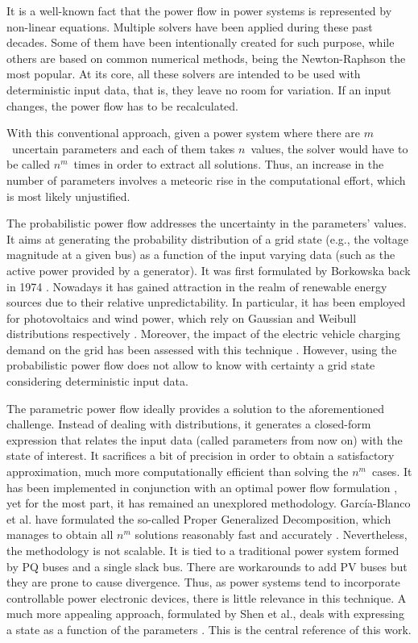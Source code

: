 It is a well-known fact that the power flow in power systems is represented by non-linear equations. Multiple solvers have been applied during these past decades. Some of them have been intentionally created for such purpose, while others are based on common numerical methods, being the Newton-Raphson the most popular. At its core, all these solvers are intended to be used with deterministic input data, that is, they leave no room for variation. If an input changes, the power flow has to be recalculated.

With this conventional approach, given a power system where there are $m$~uncertain parameters and each of them takes $n$~values, the solver would have to be called $n^m$~times in order to extract all solutions. Thus, an increase in the number of parameters involves a meteoric rise in the computational effort, which is most likely unjustified. 

The probabilistic power flow addresses the uncertainty in the parameters' values. It aims at generating the probability distribution of a grid state (e.g., the voltage magnitude at a given bus) as a function of the input varying data (such as the active power provided by a generator). It was first formulated by Borkowska back in 1974 \cite{borkowska1974}. Nowadays it has gained attraction in the realm of renewable energy sources due to their relative unpredictability. In particular, it has been employed for photovoltaics and wind power, which rely on Gaussian and Weibull distributions respectively \cite{li2019, morales2010, fan2012}. Moreover, the impact of the electric vehicle charging demand on the grid has been assessed with this technique \cite{li2012}. However, using the probabilistic power flow does not allow to know with certainty a grid state considering deterministic input data. 

The parametric power flow ideally provides a solution to the aforementioned challenge. Instead of dealing with distributions, it generates a closed-form expression that relates the input data (called parameters from now on) with the state of interest. It sacrifices a bit of precision in order to obtain a satisfactory approximation, much more computationally efficient than solving the $n^m$~cases. It has been implemented in conjunction with an optimal power flow formulation \cite{almeida1994}, yet for the most part, it has remained an unexplored methodology. García-Blanco et al. have formulated the so-called Proper Generalized Decomposition, which manages to obtain all $n^m$ solutions reasonably fast and accurately \cite{garcia2017, blanco2017}. Nevertheless, the methodology is not scalable. It is tied to a traditional power system formed by PQ buses and a single slack bus. There are workarounds to add PV buses but they are prone to cause divergence. Thus, as power systems tend to incorporate controllable power electronic devices, there is little relevance in this technique. A much more appealing approach, formulated by Shen et al., deals with expressing a state as a function of the parameters \cite{shen2020}. This is the central reference of this work. 

